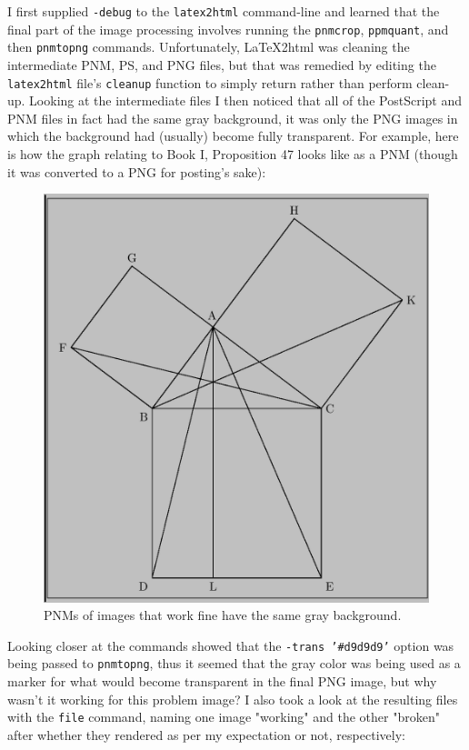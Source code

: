 \documentclass{article}
\begin{document}
I first supplied \texttt{-debug} to the \texttt{latex2html} command-line and learned that the final part of the image processing involves running the \texttt{pnmcrop}, \texttt{ppmquant}, and then \texttt{pnmtopng} commands.  Unfortunately, \LaTeX2html was cleaning the intermediate PNM, PS, and PNG files, but that was remedied by editing the \texttt{latex2html} file's \texttt{cleanup} function to simply return rather than perform clean-up.  Looking at the intermediate files I then noticed that all of the PostScript and PNM files in fact had the same gray background, it was only the PNG images in which the background had (usually) become fully transparent.  For example, here is how the graph relating to Book I, Proposition 47 looks like as a PNM (though it was converted to a PNG for posting's sake):
\begin{figure}
\includegraphics[scale=0.5]{files/blog/2019_02_21_math_euclid_pt1/2019_02_21_workspnm.png}
\caption{PNMs of images that work fine have the same gray background.}
\end{figure}
Looking closer at the commands showed that the \texttt{-trans '#d9d9d9'} option was being passed to \texttt{pnmtopng}, thus it seemed that the gray color was being used as a marker for what would become transparent in the final PNG image, but why wasn't it working for this problem image?  I also took a look at the resulting files with the \texttt{file} command, naming one image "working" and the other "broken" after whether they rendered as per my expectation or not, respectively:
\end{document}
